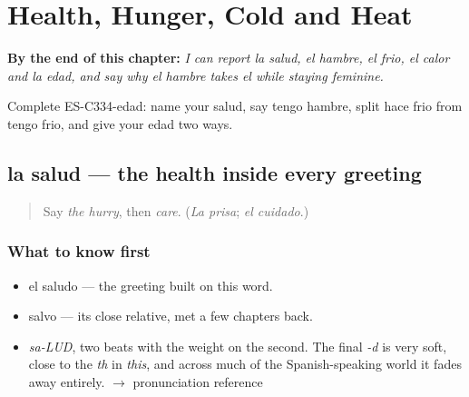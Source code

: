 
\chapter{Health, Hunger, Cold and Heat}
\label{ch:salud-y-edad}

\begin{chapteropening}
\textbf{By the end of this chapter:} \emph{I can report la salud, el hambre, el frio, el calor and la edad, and say why el hambre takes el while staying feminine.}

Complete ES-C334-edad: name your salud, say tengo hambre, split hace frio from tengo frio, and give your edad two ways.
\end{chapteropening}

\section[la salud]{la salud — the health inside every greeting}

\label{lesson:ES-C334-salud}



\begin{quote}
Say \emph{the hurry}, then \emph{care}. (\emph{La prisa}; \emph{el cuidado}.)
\end{quote}

\subsection*{What to know first}
\begin{itemize}
\raggedright
  \item el saludo — the greeting built on this word.
  \item salvo — its close relative, met a few chapters back.
\end{itemize}

\begin{sounds}
\begin{itemize}
\raggedright
  \item \emph{sa-LUD}, two beats with the weight on the second. The final \emph{-d} is very soft, close to the \emph{th} in \emph{this}, and across much of the Spanish-speaking world it fades away entirely. $\to$ pronunciation reference
\end{itemize}
\end{sounds}

